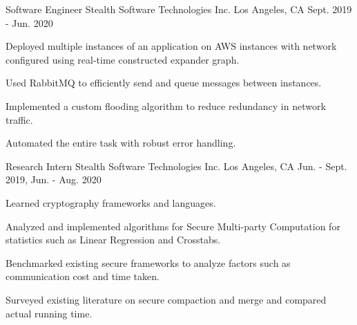 \begin{cventries}
  \cventry
    {Software Engineer} %
    {Stealth Software Technologies Inc.} %
    {Los Angeles, CA} %
    {Sept. 2019 - Jun. 2020} %
    {
      \begin{cvitems} %
        \item{Deployed multiple instances of an application on AWS instances with network configured using real-time constructed expander
graph.}
        \item{Used RabbitMQ to efficiently send and queue messages between instances.}
        \item{Implemented a custom flooding algorithm to reduce redundancy in network traffic.} 
        \item{Automated the entire task with robust error handling.}
      \end{cvitems}
    }
    
\cventry
{Research Intern} %
{Stealth Software Technologies Inc.} %
{Los Angeles, CA} %
{Jun. - Sept. 2019, Jun. - Aug. 2020} %
{
  \begin{cvitems} %
    \item{Learned cryptography frameworks and languages.}
    \item{Analyzed and implemented algorithms for Secure Multi-party Computation for statistics such as Linear Regression and Crosstabs.}
    \item{Benchmarked existing secure frameworks to analyze factors such as communication cost and time taken.}
    \item{Surveyed existing literature on secure compaction and merge and compared actual running time.}
  \end{cvitems}
}

\end{cventries}
